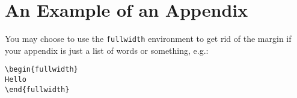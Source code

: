 \chapter{An Example of an Appendix}\label{apndxA}

\begin{fullwidth}
You may choose to use the \texttt{fullwidth} environment to get rid of the margin if your appendix is just a list of words or something, e.g.: \begin{verbatim}
\begin{fullwidth}
Hello
\end{fullwidth}
\end{verbatim}
\end{fullwidth}